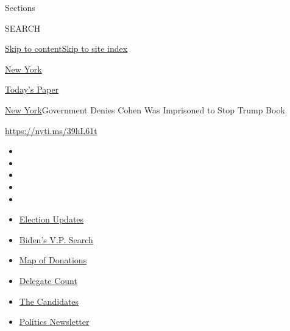 Sections

SEARCH

\protect\hyperlink{site-content}{Skip to
content}\protect\hyperlink{site-index}{Skip to site index}

\href{https://www.nytimes3xbfgragh.onion/section/nyregion}{New York}

\href{https://myaccount.nytimes3xbfgragh.onion/auth/login?response_type=cookie\&client_id=vi}{}

\href{https://www.nytimes3xbfgragh.onion/section/todayspaper}{Today's
Paper}

\href{/section/nyregion}{New York}\textbar{}Government Denies Cohen Was
Imprisoned to Stop Trump Book

\url{https://nyti.ms/39hL61t}

\begin{itemize}
\item
\item
\item
\item
\item
\end{itemize}

\begin{itemize}
\item
  \href{https://www.nytimes3xbfgragh.onion/2020/08/03/us/elections/biden-vs-trump.html?action=click\&pgtype=Article\&state=default\&region=TOP_BANNER\&context=storylines_menu}{Election
  Updates}
\item
  \href{https://www.nytimes3xbfgragh.onion/article/biden-vice-president-2020.html?action=click\&pgtype=Article\&state=default\&region=TOP_BANNER\&context=storylines_menu}{Biden's
  V.P. Search}
\item
  \href{https://www.nytimes3xbfgragh.onion/interactive/2020/07/24/us/politics/trump-biden-campaign-donors.html?action=click\&pgtype=Article\&state=default\&region=TOP_BANNER\&context=storylines_menu}{Map
  of Donations}
\item
  \href{https://www.nytimes3xbfgragh.onion/interactive/2020/us/elections/delegate-count-primary-results.html?action=click\&pgtype=Article\&state=default\&region=TOP_BANNER\&context=storylines_menu}{Delegate
  Count}
\item
  \href{https://www.nytimes3xbfgragh.onion/interactive/2019/us/politics/2020-presidential-candidates.html?action=click\&pgtype=Article\&state=default\&region=TOP_BANNER\&context=storylines_menu}{The
  Candidates}
\item
  \href{https://www.nytimes3xbfgragh.onion/newsletters/politics?action=click\&pgtype=Article\&state=default\&region=TOP_BANNER\&context=storylines_menu}{Politics
  Newsletter}
\end{itemize}

